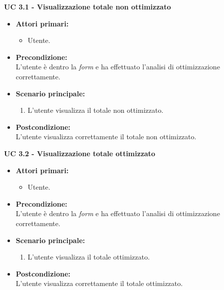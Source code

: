 \vspace{0.5cm}

\noindent \textbf{\large UC 3.1 - Visualizzazione totale non ottimizzato}
\label{uc:visualizzazione-totale-non-ottimizzato}
\begin{itemize}

	\item \textbf{Attori primari: }
		\begin{itemize}
			\item Utente.
		\end{itemize}

	\item \textbf{Precondizione: }\\[0.3cm]
		L'utente è dentro la \textit{form} e ha effettuato l'analisi di ottimizzazione correttamente.

	\item \textbf{Scenario principale: }
		\begin{enumerate}
			\item L'utente visualizza il totale non ottimizzato.
		\end{enumerate}
		

	\item \textbf{Postcondizione: }\\[0.3cm]
		L'utente visualizza correttamente il totale non ottimizzato.

\end{itemize}

\vspace{0.5cm}

\noindent \textbf{\large UC 3.2 - Visualizzazione totale ottimizzato}
\label{uc:visualizzazione-totale-ottimizzato}
\begin{itemize}

	\item \textbf{Attori primari: }
		\begin{itemize}
			\item Utente.
		\end{itemize}

	\item \textbf{Precondizione: }\\[0.3cm]
		L'utente è dentro la \textit{form} e ha effettuato l'analisi di ottimizzazione correttamente.

	\item \textbf{Scenario principale: }
		\begin{enumerate}
			\item L'utente visualizza il totale ottimizzato.
		\end{enumerate}
		

	\item \textbf{Postcondizione: }\\[0.3cm]
		L'utente visualizza correttamente il totale ottimizzato.

\end{itemize}

